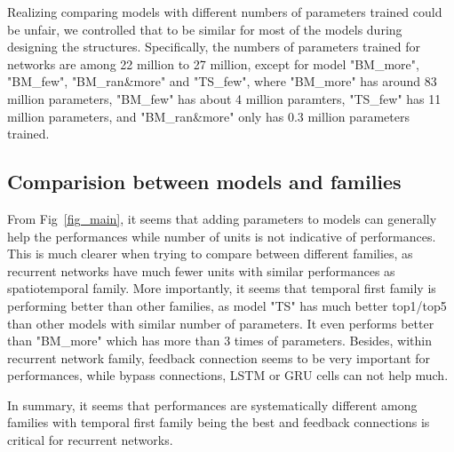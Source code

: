 Realizing comparing models with different numbers of parameters trained could be unfair, we controlled that to be similar for most of the models during designing the structures. 
Specifically, the numbers of parameters trained for networks are among 22 million to 27 million, except for model "BM\_more", "BM\_few", "BM\_ran\&more" and "TS\_few", where "BM\_more" has around 83 million parameters, "BM\_few" has about 4 million paramters, "TS\_few" has 11 million parameters, and "BM\_ran\&more" only has 0.3 million parameters trained.

\subsection{Comparision between models and families}

From Fig~\ref{fig_main}, it seems that adding parameters to models can generally help the performances while number of units is not indicative of performances. 
This is much clearer when trying to compare between different families, as recurrent networks have much fewer units with similar performances as spatiotemporal family. 
More importantly, it seems that temporal first family is performing better than other families, as model "TS" has much better top1/top5 than other models with similar number of parameters.
It even performs better than "BM\_more" which has more than 3 times of parameters. 
Besides, within recurrent network family, feedback connection seems to be very important for performances, while bypass connections, LSTM or GRU cells can not help much.

In summary, it seems that performances are systematically different among families with temporal first family being the best and feedback connections is critical for recurrent networks.
